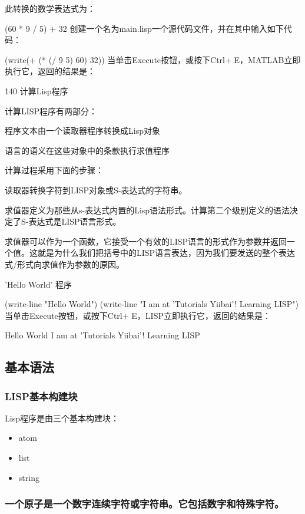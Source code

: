 \documentclass[11pt]{ctexart}
\begin{document}
{{{{此转换的数学表达式为：

(60 * 9 / 5) + 32
创建一个名为main.lisp一个源代码文件，并在其中输入如下代码：

(write(+ (* (/ 9 5) 60) 32))
当单击Execute按钮，或按下Ctrl+ E，MATLAB立即执行它，返回的结果是：

140
计算Lisp程序

计算LISP程序有两部分：

程序文本由一个读取器程序转换成Lisp对象

语言的语义在这些对象中的条款执行求值程序

计算过程采用下面的步骤：

读取器转换字符到LISP对象或S-表达式的字符串。

求值器定义为那些从s-表达式内置的Lisp语法形式。计算第二个级别定义的语法决定了S-表达式是LISP语言形式。

求值器可以作为一个函数，它接受一个有效的LISP语言的形式作为参数并返回一个值。这就是为什么我们把括号中的LISP语言表达，因为我们要发送的整个表达式/形式向求值作为参数的原因。

'Hello World' 程序

(write-line "Hello World")
(write-line "I am at 'Tutorials Yiibai'! Learning LISP")
当单击Execute按钮，或按下Ctrl+ E，LISP立即执行它，返回的结果是：

Hello World
I am at 'Tutorials Yiibai'! Learning LISP
\subsection{基本语法}
\label{sec:orgf03b19a}
\subsubsection{LISP基本构建块}
\label{sec:org4baa76f}

Lisp程序是由三个基本构建块：

\begin{itemize}
\item atom

\item list

\item string
\end{itemize}

\subsubsection{一个原子是一个数字连续字符或字符串。它包括数字和特殊字符。}
\label{sec:orga959142}

}}}}
\end{document}
